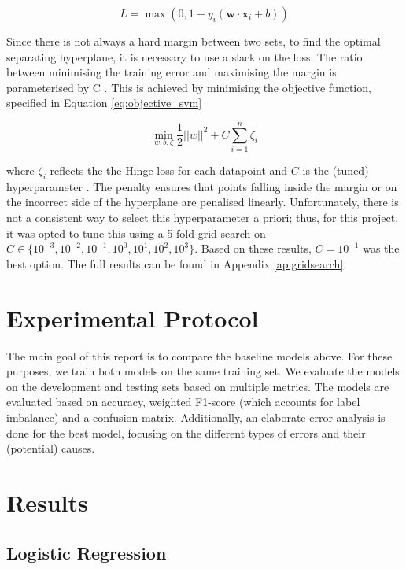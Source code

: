 \documentclass[12pt,a4paper,english]{article}
\begin{document}
\begin{equation}
    L = \max(0, 1 - y_i(\boldsymbol{w} \cdot \boldsymbol{x}_i + b))
    \label{eq:hinge_loss}
\end{equation}

Since there is not always a hard margin between two sets, to find the optimal separating hyperplane, it is necessary to use a slack on the loss. The ratio between minimising the training error and maximising the margin is parameterised by C \cite{lwkBook}. This is achieved by minimising the objective function, specified in Equation \eqref{eq:objective_svm}

\begin{equation}
    \min_{w,b,\zeta } \frac{1}{2} ||w||^2 + C \sum_{i=1}^n \zeta_i
    \label{eq:objective_svm}
\end{equation}

where $\zeta_i$ reflects the the Hinge loss for each datapoint and $C$ is the (tuned) hyperparameter \cite{lwkBook}. The penalty ensures that points falling inside the margin or on the incorrect side of the hyperplane are penalised linearly. Unfortunately, there is not a consistent way to select this hyperparameter a priori; thus, for this project, it was opted to tune this using a 5-fold grid search on $C \in \{10^{-3}, 10^{-2}, 10^{-1}, 10^{0}, 10^1, 10^2, 10^3\}$. Based on these results, $C=10^{-1}$ was the best option. The full results can be found in Appendix \ref{ap:gridsearch}.

\section{Experimental Protocol}
The main goal of this report is to compare the baseline models above. For these purposes, we train both models on the same training set. We evaluate the models on the development and testing sets based on multiple metrics. The models are evaluated based on accuracy, weighted F1-score (which accounts for label imbalance) and a confusion matrix. Additionally, an elaborate error analysis is done for the best model, focusing on the different types of errors and their (potential) causes. 

\section{Results}

\subsection{Logistic Regression}
\end{document}

